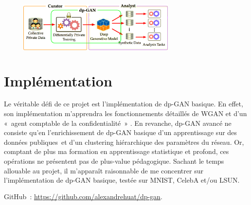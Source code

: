 \documentclass[a4paper,11pt]{article}
\theoremstyle{definition}
\begin{document}
\begin{figure}
    \centering
    \includegraphics[width=0.7\textwidth]{dp-gan_role.png}
    \label{dp-gan_role}
\end{figure}

\section{Implémentation}
Le véritable défi de ce projet est l'implémentation de dp-GAN basique. En effet, son implémentation m'apprendra les fonctionnements détaillés de WGAN et d'un « agent comptable de la confidentialité » \citep{pinq}. En revanche, dp-GAN avancé ne consiste qu'en l'enrichissement de dp-GAN basique d'un apprentissage sur des données publiques et d'un clustering hiérarchique des paramètres du réseau. Or, comptant de plus ma formation en apprentissage statistique et profond, ces opérations ne présentent pas de plus-value pédagogique. Sachant le temps allouable au projet, il m'apparaît raisonnable de me concentrer sur l'implémentation de dp-GAN basique, testée sur MNIST, CelebA et/ou LSUN.

GitHub : \url{https://github.com/alexandrehuat/dp-gan}.

\printbibliography[title=Références,heading=bibintoc]
\end{document}
